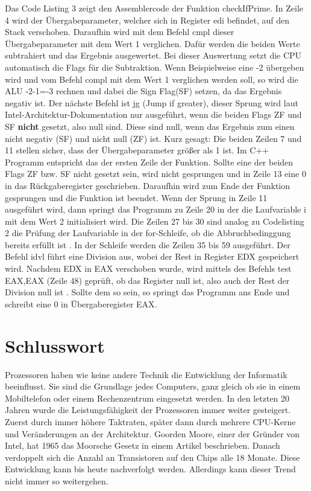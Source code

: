 \documentclass[12pt]{article}
\begin{document}
Das Code Listing 3 zeigt den Assemblercode der Funktion checkIfPrime. In Zeile 4 wird der Übergabeparameter, welcher sich in Register edi befindet, auf den Stack verschoben. Daraufhin wird mit dem Befehl cmpl dieser Übergabeparameter mit dem Wert 1 verglichen. Dafür werden die beiden Werte subtrahiert und das Ergebnis ausgewertet. Bei dieser Auswertung setzt die CPU automatisch die Flags für die Subtraktion. Wenn Beispielweise eine -2 übergeben wird und vom Befehl compl mit dem Wert 1 verglichen werden soll, so wird die ALU -2-1=-3 rechnen und dabei die Sign Flag(SF) setzen, da das Ergebnis negativ ist. Der nächste Befehl ist jg (Jump if greater), dieser Sprung wird laut Intel-Architektur-Dokumentation nur ausgeführt, wenn die beiden Flags ZF und SF \textbf{nicht} gesetzt, also null sind. Diese sind null, wenn das Ergebnis zum einen nicht negativ (SF) und nicht null (ZF) ist. \newline Kurz gesagt: Die beiden Zeilen 7 und 11 stellen sicher, dass der Übergabeparameter größer als 1 ist. Im C++ Programm entspricht das der ersten Zeile der Funktion. Sollte eine der beiden Flags ZF bzw. SF nicht gesetzt sein, wird nicht gesprungen und in Zeile 13 eine 0 in das Rückgaberegister geschrieben. Daraufhin wird zum Ende der Funktion gesprungen und die Funktion ist beendet. Wenn der Sprung in Zeile 11 ausgeführt wird, dann springt das Programm zu Zeile 20 in der die Laufvariable i  mit dem Wert 2 initialisiert wird. Die Zeilen 27 bis 30 sind analog zu Codelisting 2 die Prüfung der Laufvariable in der for-Schleife, ob die Abbruchbedinggung bereits erfüllt ist \cite{c}. In der Schleife werden die Zeilen 35 bis 59 ausgeführt. Der Befehl idvl führt eine Division aus, wobei der Rest in Register EDX gespeichert wird. Nachdem EDX in EAX verschoben wurde, wird mittels des Befehls test EAX,EAX (Zeile 48) geprüft, ob das Register null ist, also auch der Rest der Division null ist \cite{elements2005}. Sollte dem so sein, so springt das Programm ans Ende und schreibt eine 0 in Übergaberegister EAX\cite[S.202]{technischeInformatik2}.
\newpage

\section{Schlusswort}
Prozessoren haben wie keine andere Technik die Entwicklung der Informatik beeinflusst. Sie sind die Grundlage jedes Computers, ganz gleich ob sie in einem Mobiltelefon oder einem Rechenzentrum eingesetzt werden. In den letzten 20 Jahren wurde die Leistungsfähigkeit der Prozessoren immer weiter gesteigert. Zuerst durch immer höhere Taktraten, später dann durch mehrere CPU-Kerne und Veränderungen an der Architektur. Goorden Moore, einer der Gründer von Intel, hat 1965 das Moorsche Gesetz in einem Artikel beschrieben. Danach verdoppelt sich die Anzahl an Transistoren auf den Chips alle 18 Monate. Diese Entwicklung kann bis heute nachverfolgt werden. Allerdings kann dieser Trend nicht immer so weitergehen. 
\end{document}
